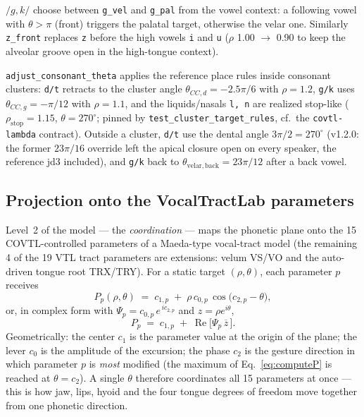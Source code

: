 \documentclass[11pt,a4paper]{article}
\begin{document}
\begin{description}[leftmargin=2em]
\item[Conditional places.] \(/g, k/\) choose between \texttt{g\_vel} and
      \texttt{g\_pal} from the vowel context: a following vowel with
      \(\theta > \pi\) (front) triggers the palatal target, otherwise the
      velar one. Similarly \texttt{z\_front} replaces \texttt{z} before
      the high vowels \texttt{i} and \texttt{u} (\(\rho\) 1.00
      \(\to\) 0.90 to keep the alveolar groove open in the high-tongue
      context).
\item[Cluster rules.] \texttt{adjust\_consonant\_theta} applies the
      reference place rules inside consonant clusters: \texttt{d/t}
      retracts to the cluster angle \(\theta_{CC,d} = -2.5\pi/6\) with
      \(\rho = 1.2\), \texttt{g/k} uses \(\theta_{CC,g} = -\pi/12\) with
      \(\rho = 1.1\), and the liquids/nasals \texttt{l, n} are realized
      stop-like (\(\rho_{\mathrm{stop}} = 1.15\), \(\theta = 270^\circ\);
      pinned by \texttt{test\_cluster\_target\_rules}, cf.\ the
      \texttt{covtl-lambda} contract).
      Outside a cluster, \texttt{d/t} use the dental angle
\(3\pi/2 = 270^\circ\) (v1.2.0: the former \(23\pi/16\)
override left the apical closure open on every speaker, the
reference jd3 included), and \texttt{g/k} back to
\(\theta_{\mathrm{velar,back}} = 23\pi/12\) after a back vowel.
\end{description}

\subsection{Projection onto the VocalTractLab parameters}\label{subsec:projection}

Level~2 of the model --- the \emph{coordination} --- maps the phonetic
plane onto the 15 COVTL-controlled parameters of a Maeda-type vocal-tract
model (the remaining 4 of the 19 VTL tract parameters are extensions:
velum VS/VO and the auto-driven tongue root TRX/TRY). For a static target
\((\rho,\theta)\), each parameter \(p\) receives
\begin{equation}
P_p(\rho, \theta) \;=\; c_{1,p} \;+\; \rho\, c_{0,p}\,
\cos\!\big(c_{2,p} - \theta\big),
\label{eq:computeP}
\end{equation}
or, in complex form with \(\Psi_p = c_{0,p}\, e^{\,i c_{2,p}}\) and
\(z = \rho e^{i\theta}\),
\begin{equation}
P_p \;=\; c_{1,p} \;+\; \operatorname{Re}\!\big[\Psi_p\, \overline{z}\,\big].
\label{eq:computeP-cplx}
\end{equation}
Geometrically: the center \(c_1\) is the parameter value at the origin of
the plane; the lever \(c_0\) is the amplitude of the excursion; the phase
\(c_2\) is the gesture direction in which parameter \(p\) is \emph{most}
modified (the maximum of Eq.~\eqref{eq:computeP} is reached at
\(\theta = c_2\)). A single \(\theta\) therefore coordinates all 15
parameters at once --- this is how jaw, lips, hyoid and the four tongue
degrees of freedom move together from one phonetic direction.
\end{document}
